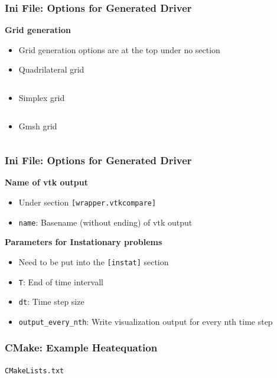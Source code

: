 \documentclass[aspectratio=169,11pt]{beamer}
\theoremstyle{definition}
\begin{document}
\begin{frame}[fragile]
  \frametitle{Ini File: Options for Generated Driver}
  \textbf{Grid generation}


  \begin{itemize}
  \item Grid generation options are at the top under no section
  \item Quadrilateral grid
    \inputminted[fontsize=\tiny, firstline=1, lastline=2]{ini}{../src/heatequation.ini}
  \item Simplex grid
    \inputminted[fontsize=\tiny, firstline=1, lastline=4]{ini}{../src/poisson.ini}
  \item Gmsh grid
    \inputminted[fontsize=\tiny, firstline=1, lastline=1]{ini}{../exercise/task/navier_stokes.ini}

  \end{itemize}

\end{frame}

\begin{frame}[fragile]
  \frametitle{Ini File: Options for Generated Driver}
  \vfill
  \textbf{Name of vtk output}
  \begin{itemize}
  \item Under section \lstinline{[wrapper.vtkcompare]}
  \item \lstinline{name}: Basename (without ending) of vtk output
  \end{itemize}
  \vfill
  \textbf{Parameters for Instationary problems}
  \begin{itemize}
  \item Need to be put into the \lstinline{[instat]} section
  \item \lstinline{T}: End of time intervall
  \item \lstinline{dt}: Time step size
  \item \lstinline{output_every_nth}: Write visualization output for every nth time
    step
  \end{itemize}
  \vfill
\end{frame}

\begin{frame}[fragile]
  \frametitle{CMake: Example Heatequation}

  
  \lstinline{CMakeLists.txt}
  \inputminted[fontsize=\tiny, firstline=3, lastline=9]{cmake}{../src/CMakeLists.txt}
\end{frame}
\end{document}
